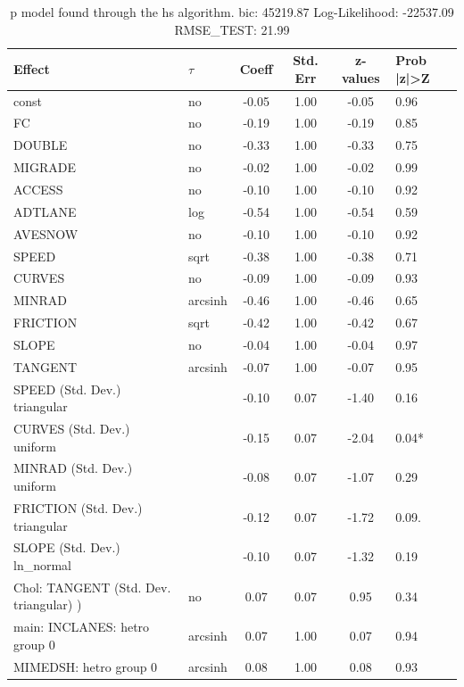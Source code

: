 \begin{table}
	\caption{p model found through the hs algorithm. bic: 45219.87 Log-Likelihood: -22537.09 RMSE_TEST: 21.99}
	\begin{center}
		\begin{tabular}{|l|l|c|c|c|l|}
			\hline
			Effect & $\tau$ & Coeff & Std. Err & z-values & Prob |z|>Z \\
			\hline
			const & no & -0.05 & 1.00 & -0.05 & 0.96 \\
			\hline
			FC & no & -0.19 & 1.00 & -0.19 & 0.85 \\
			\hline
			DOUBLE & no & -0.33 & 1.00 & -0.33 & 0.75 \\
			\hline
			MIGRADE & no & -0.02 & 1.00 & -0.02 & 0.99 \\
			\hline
			ACCESS & no & -0.10 & 1.00 & -0.10 & 0.92 \\
			\hline
			ADTLANE & log & -0.54 & 1.00 & -0.54 & 0.59 \\
			\hline
			AVESNOW & no & -0.10 & 1.00 & -0.10 & 0.92 \\
			\hline
			SPEED & sqrt & -0.38 & 1.00 & -0.38 & 0.71 \\
			\hline
			CURVES & no & -0.09 & 1.00 & -0.09 & 0.93 \\
			\hline
			MINRAD & arcsinh & -0.46 & 1.00 & -0.46 & 0.65 \\
			\hline
			FRICTION & sqrt & -0.42 & 1.00 & -0.42 & 0.67 \\
			\hline
			SLOPE & no & -0.04 & 1.00 & -0.04 & 0.97 \\
			\hline
			TANGENT & arcsinh & -0.07 & 1.00 & -0.07 & 0.95 \\
			\hline
			SPEED (Std. Dev.) triangular &  & -0.10 & 0.07 & -1.40 & 0.16 \\
			\hline
			CURVES (Std. Dev.) uniform &  & -0.15 & 0.07 & -2.04 & 0.04* \\
			\hline
			MINRAD (Std. Dev.) uniform &  & -0.08 & 0.07 & -1.07 & 0.29 \\
			\hline
			FRICTION (Std. Dev.) triangular &  & -0.12 & 0.07 & -1.72 & 0.09. \\
			\hline
			SLOPE (Std. Dev.) ln_normal &  & -0.10 & 0.07 & -1.32 & 0.19 \\
			\hline
			 Chol: TANGENT (Std. Dev. triangular) ) & no & 0.07 & 0.07 & 0.95 & 0.34 \\
			\hline
			main: INCLANES: hetro group 0 & arcsinh & 0.07 & 1.00 & 0.07 & 0.94 \\
			\hline
			MIMEDSH: hetro group 0 & arcsinh & 0.08 & 1.00 & 0.08 & 0.93 \\

\end{tabular}
\end{center}
\end{table}
